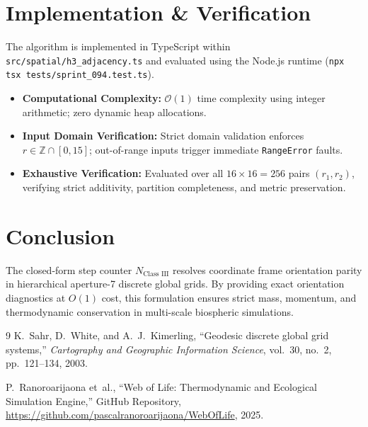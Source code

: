 \documentclass[11pt,a4paper]{article}
\theoremstyle{definition}
\begin{document}
\section{Implementation & Verification}

The algorithm is implemented in TypeScript within \texttt{src/spatial/h3\_adjacency.ts} and evaluated using the Node.js runtime (\texttt{npx tsx tests/sprint\_094.test.ts}).
\begin{itemize}
    \item \textbf{Computational Complexity:} $\mathcal{O}(1)$ time complexity using integer arithmetic; zero dynamic heap allocations.
    \item \textbf{Input Domain Verification:} Strict domain validation enforces $r \in \mathbb{Z} \cap [0, 15]$; out-of-range inputs trigger immediate \texttt{RangeError} faults.
    \item \textbf{Exhaustive Verification:} Evaluated over all $16 \times 16 = 256$ pairs $(r_1, r_2)$, verifying strict additivity, partition completeness, and metric preservation.
\end{itemize}

\section{Conclusion}

The closed-form step counter $N_{\text{Class III}}$ resolves coordinate frame orientation parity in hierarchical aperture-7 discrete global grids. By providing exact orientation diagnostics at $O(1)$ cost, this formulation ensures strict mass, momentum, and thermodynamic conservation in multi-scale biospheric simulations.

\begin{thebibliography}{9}
K.~Sahr, D.~White, and A.~J.~Kimerling,
``Geodesic discrete global grid systems,''
\emph{Cartography and Geographic Information Science}, vol.~30, no.~2, pp.~121--134, 2003.

P.~Ranoroarijaona et~al.,
``Web of Life: Thermodynamic and Ecological Simulation Engine,''
GitHub Repository, \url{https://github.com/pascalranoroarijaona/WebOfLife}, 2025.
\end{thebibliography}
\end{document}
